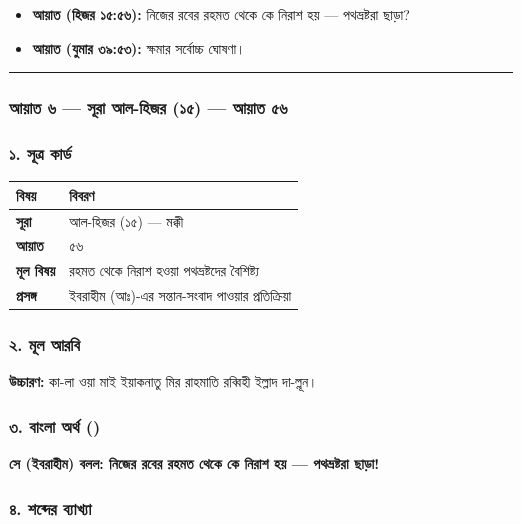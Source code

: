\begin{itemize}
\item \textbf{আয়াত (হিজর ১৫:৫৬):} নিজের রবের রহমত থেকে কে নিরাশ হয় — পথভ্রষ্টরা ছাড়া?
\item \textbf{আয়াত (যুমার ৩৯:৫৩):} ক্ষমার সর্বোচ্চ ঘোষণা।
\end{itemize}
\medskip\hrule\medskip

\subsubsection*{আয়াত ৬ — সূরা আল-হিজর (১৫) — আয়াত ৫৬}

\subsubsection*{১. সূত্র কার্ড}

\begin{table}[h]\centering\small
\begin{tabular}{ll}
বিষয় & বিবরণ \\
\hline
\textbf{সূরা} & আল-হিজর (১৫) — মক্কী \\
\textbf{আয়াত} & ৫৬ \\
\textbf{মূল বিষয়} & রহমত থেকে নিরাশ হওয়া পথভ্রষ্টদের বৈশিষ্ট্য \\
\textbf{প্রসঙ্গ} & ইবরাহীম (আঃ)-এর সন্তান-সংবাদ পাওয়ার প্রতিক্রিয়া \\
\hline
\end{tabular}
\end{table}

\subsubsection*{২. মূল আরবি}

\begin{center}\end{center}
\textbf{উচ্চারণ:} কা-লা ওয়া মাই ইয়াকনাতু মির রাহমাতি রব্বিহী ইল্লাদ দা-ল্লূন।

\subsubsection*{৩. বাংলা অর্থ ()}

\textbf{সে (ইবরাহীম) বলল: নিজের রবের রহমত থেকে কে নিরাশ হয় — পথভ্রষ্টরা ছাড়া!}

\subsubsection*{৪. শব্দের ব্যাখ্যা}

